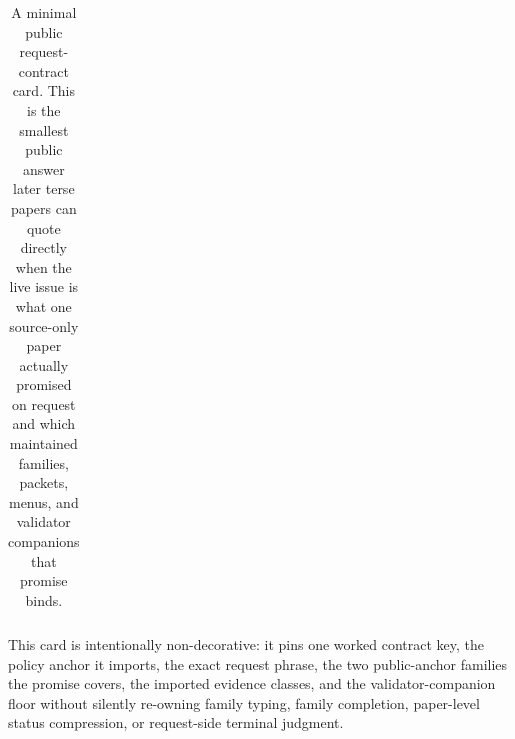 \documentclass[11pt]{article}
\begin{document}
\begin{table}[t]
\begin{tabularx}{0.97\linewidth}{@{}p{0.31\linewidth}X@{}}
\bottomrule
\end{tabularx}
\caption{A minimal public request-contract card. This is the smallest public answer later terse papers can quote directly when the live issue is what one source-only paper actually promised on request and which maintained families, packets, menus, and validator companions that promise binds.}
\label{tab:minimal-public-request-contract-card}
\end{table}

This card is intentionally non-decorative: it pins one worked contract key, the policy anchor it imports, the exact request phrase, the two public-anchor families the promise covers, the imported evidence classes, and the validator-companion floor without silently re-owning family typing, family completion, paper-level status compression, or request-side terminal judgment.\cite{series:workedexample}
\end{document}
